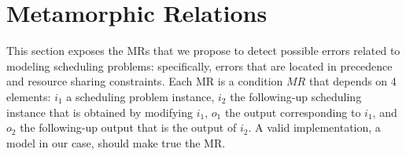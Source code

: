 \section{Metamorphic Relations}\label{sec:metamorfic_relations}


This section exposes the MRs that we propose to detect possible errors
related to modeling scheduling problems: specifically, errors
that are located in precedence and resource sharing
constraints. Each MR is a condition $MR$ that depends
on 4 elements: $i_{1}$ a scheduling problem instance, $i_{2}$ the
following-up scheduling instance that is obtained by modifying
$i_{1}$, $o_{1}$ the output corresponding to $i_{1}$, and $o_{2}$ the
following-up output that is the output of $i_{2}$. A valid
implementation, a model in our case, should make true the MR.


